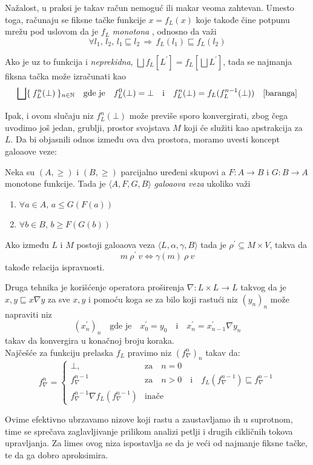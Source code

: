 Nažalost, u praksi je takav račun nemoguć ili makar veoma zahtevan. Umesto toga, računaju se fiksne tačke funkcije $x = f_{L}(x)$ koje takođe čine potpunu mrežu pod uslovom da je $f_{L}$ \emph{monotona} \cite{tarski}, odnosno da važi $$\forall l_{1},\, l_{2},\, l_{1} \sqsubseteq l_{2} \, \Rightarrow \, f_{L}(l_1) \sqsubseteq f_{L}(l_2)$$ 

 Ako je uz to funkcija i \emph{neprekidna}, $\bigsqcup f_{L}[L^{\prime}] = f_{L}[\bigsqcup L^{\prime}]$, tada se najmanja fiksna tačka može izračunati kao $$\bigsqcup \{ \: f^{n}_{L}(\bot)\: \}_{n \in \mathbb{N}} \quad \text{gde je} \quad f^{0}_{L}(\bot) = \bot \quad \text{i} \quad f^{n}_{L}(\bot) = f_{L}(f^{n-1}_{L}(\bot)) \quad \cite{baranga}$$

Ipak, i ovom slučaju niz $f^{n}_{L} ( \bot )$ može previše sporo konvergirati, zbog čega uvodimo još jedan, grublji, prostor svojstava $M$ koji će služiti kao apstrakcija za $L$. Da bi objasnili odnos između ova dva prostora, moramo uvesti koncept galoaove veze:
\begin{definicija}
Neka su $(A, \geqslant)$ i $(B, \geqslant)$ parcijalno uređeni skupovi a $F : A \rightarrow B$ i $G : B \rightarrow A$ monotone funkcije. Tada je $\langle A, 	F, G, B \rangle$ \emph{galoaova veza} ukoliko važi 
\begin{enumerate}
\item $\forall a \in A, \, a \leqslant G (F (a))$ 
\item $\forall b \in B, \, b \geqslant F (G (b))$
\end{enumerate}
\end{definicija} 

\begin{teorema}
Ako između $L$ i $M$ postoji galoaova veza $\langle L, \alpha, \gamma, B \rangle$ tada je $\rho^{\prime} \subseteq M \times V$, takva da $$m\: \rho^{\prime}\: v \iff \gamma (m)\: \rho \: v$$ takođe relacija ispravnosti.
\end{teorema}

Druga tehnika je korišćenje operatora proširenja $\nabla : L \times L \rightarrow L$ takvog da je $x, y \sqsubseteq x \nabla y$ za sve $x, y$ i pomoću koga se za bilo koji rastući niz $(y_{n})_{n}$ može napraviti niz $$(x^{\prime}_{n})_{n} \quad \text{gde je} \quad x^{\prime}_{0} = y_{0} \quad \text{i} \quad x^{\prime}_{n} = x^{\prime}_{n-1} \nabla y_{n} $$ takav da konvergira u konačnoj broju koraka. \\

Najčešće za funkciju prelaska $f_{L}$ pravimo niz $(f^{n}_{\nabla})_{n}$ takav da:
$$
f^{n}_{\nabla} = 
\begin{cases}
\bot,            								  & 	\text{za} \quad n = 0 \\
f^{n-1}_{\nabla} 							      & \text{za} \quad n > 0 \quad \text{i} \quad f_{L}(f^{n-1}_{\nabla}) \sqsubseteq f^{n-1}_{\nabla} \\
f^{n-1}_{\nabla} \nabla f_{L}(f^{n-1}_{\nabla})  & \text{inače}
\end{cases}
$$

Ovime efektivno ubrzavamo nizove koji rastu a zaustavljamo ih u suprotnom, time se sprečava zaglavljivanje prilikom analizi petlji i drugih cikličnih tokova upravljanja. Za limes ovog niza ispostavlja se da je veći od najmanje fiksne tačke, te da ga dobro aproksimira. 
